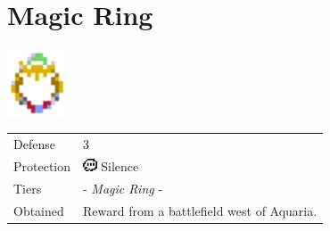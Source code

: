 \section{Magic Ring}
\label{armor:magic_ring}

\includegraphics[height=2cm,keepaspectratio]{./resources/armors/magicring}

\begin{longtable}{ l p{9cm} }
	Defense
	& 3
\\ %
	Protection
	& \includegraphics[height=1em,keepaspectratio]{./resources/effects/silence}
	Silence
\\ %
	Tiers
	& \nameref{armor:charm} - \textit{Magic Ring} - \nameref{armor:cupid_locket}
\\ %
	Obtained
	& Reward from a battlefield west of Aquaria.
\end{longtable}

